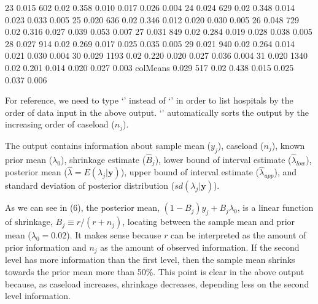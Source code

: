 \documentclass[article]{jss}
\begin{document}
\begin{CodeChunk}
\begin{CodeOutput}
23          0.015  602       0.02     0.358    0.010     0.017    0.026   0.004
24          0.024  629       0.02     0.348    0.014     0.023    0.033   0.005
25          0.020  636       0.02     0.346    0.012     0.020    0.030   0.005
26          0.048  729       0.02     0.316    0.027     0.039    0.053   0.007
27          0.031  849       0.02     0.284    0.019     0.028    0.038   0.005
28          0.027  914       0.02     0.269    0.017     0.025    0.035   0.005
29          0.021  940       0.02     0.264    0.014     0.021    0.030   0.004
30          0.029 1193       0.02     0.220    0.020     0.027    0.036   0.004
31          0.020 1340       0.02     0.201    0.014     0.020    0.027   0.003
colMeans    0.029  517       0.02     0.438    0.015     0.025    0.037   0.006
\end{CodeOutput}
\end{CodeChunk}
For reference, we need to type `' instead of `' in order to list hospitals by the order of data input in the above output. `' automatically sorts the output by the increasing order of caseload ($n_{j}$). 


The output contains information about sample mean ($y_{j}$), caseload ($n_{j}$), known prior mean ($\lambda_{0}$), shrinkage estimate ($\hat{B}_{j}$), lower bound of interval estimate ($\hat{\lambda}_{low}$), posterior mean ($\hat{\lambda}=E(\lambda_{j}\vert \textbf{y})$), upper bound of interval estimate ($\hat{\lambda}_{upp}$), and standard deviation of posterior distribution ($sd(\lambda_{j}\vert \textbf{y})$).


As we can see in (6), the posterior mean, $(1-B_{j})y_{j} + B_{j}\lambda_{0}$, is a linear function of shrinkage, $B_{j}\equiv r / (r + n_{j})$, locating between the sample mean and prior mean ($\lambda_{0}=0.02$). It makes sense because $r$ can be interpreted as the amount of prior information and $n_{j}$ as the amount of observed information. If the second level has more information than the first level, then the sample mean shrinks towards the prior mean more than 50\%. This point is clear in the above output because, as caseload increases, shrinkage decreases, depending less on the second level information.
\end{document}
